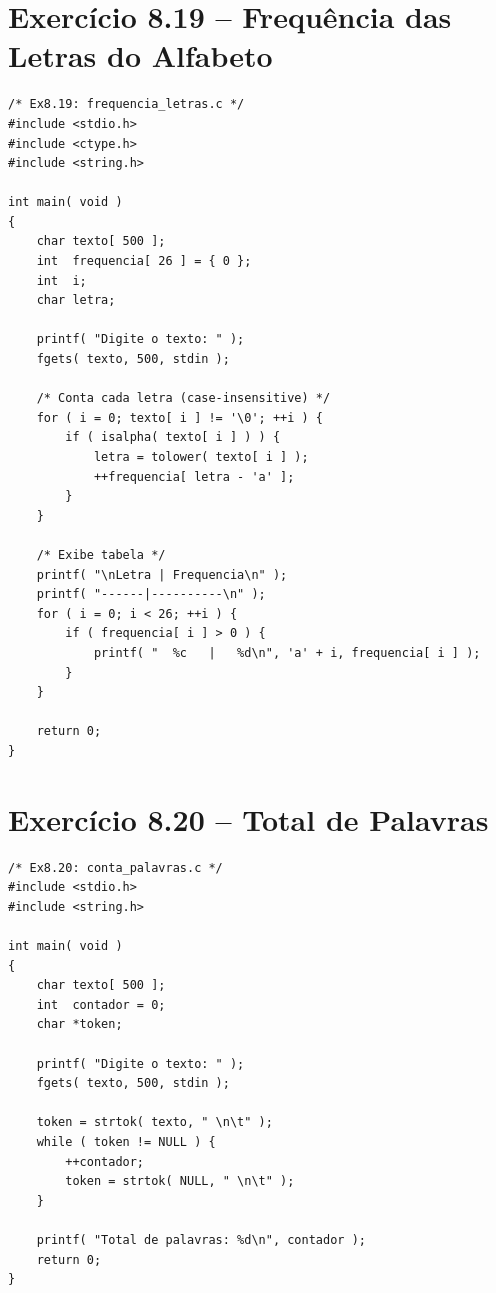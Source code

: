 \documentclass[12pt,a4paper]{article}
\begin{document}
\section{Exercício 8.19 -- Frequência das Letras do Alfabeto}

\begin{respostabox}
\begin{lstlisting}
/* Ex8.19: frequencia_letras.c */
#include <stdio.h>
#include <ctype.h>
#include <string.h>

int main( void )
{
    char texto[ 500 ];
    int  frequencia[ 26 ] = { 0 };
    int  i;
    char letra;

    printf( "Digite o texto: " );
    fgets( texto, 500, stdin );

    /* Conta cada letra (case-insensitive) */
    for ( i = 0; texto[ i ] != '\0'; ++i ) {
        if ( isalpha( texto[ i ] ) ) {
            letra = tolower( texto[ i ] );
            ++frequencia[ letra - 'a' ];
        }
    }

    /* Exibe tabela */
    printf( "\nLetra | Frequencia\n" );
    printf( "------|----------\n" );
    for ( i = 0; i < 26; ++i ) {
        if ( frequencia[ i ] > 0 ) {
            printf( "  %c   |   %d\n", 'a' + i, frequencia[ i ] );
        }
    }

    return 0;
}
\end{lstlisting}
\end{respostabox}

\newpage

\section{Exercício 8.20 -- Total de Palavras}

\begin{respostabox}
\begin{lstlisting}
/* Ex8.20: conta_palavras.c */
#include <stdio.h>
#include <string.h>

int main( void )
{
    char texto[ 500 ];
    int  contador = 0;
    char *token;

    printf( "Digite o texto: " );
    fgets( texto, 500, stdin );

    token = strtok( texto, " \n\t" );
    while ( token != NULL ) {
        ++contador;
        token = strtok( NULL, " \n\t" );
    }

    printf( "Total de palavras: %d\n", contador );
    return 0;
}
\end{lstlisting}
\end{respostabox}
\end{document}
